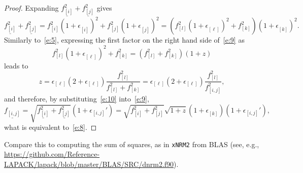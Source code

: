 \documentclass[a4paper,12pt,twoside]{article}
\begin{document}
\begin{proof}
  Expanding $\underline{f_{[i]}^2}+\underline{f_{[j]}^2}$ gives
  \begin{equation}
    \underline{f_{[i]}^2}+\underline{f_{[j]}^2}=f_{[i]}^2(1+\epsilon_{[i]}^{})^2+f_{[j]}^2(1+\epsilon_{[j]}^{})^2=(f_{[l]}^2(1+\epsilon_{[\ell]}^{})^2+f_{[k]}^2)(1+\epsilon_{[k]}^{})^2.
    \label{e:9}
  \end{equation}
  Similarly to~\eqref{e:5}, expressing the first factor on the right hand
  side of~\eqref{e:9} as
  \begin{equation}
    f_{[l]}^2(1+\epsilon_{[\ell]}^{})^2+f_{[k]}^2=(f_{[l]}^2+f_{[k]}^2)(1+z)
    \label{e:10}
  \end{equation}
  leads to
  \begin{displaymath}
    z=\epsilon_{[\ell]}(2+\epsilon_{[\ell]})\frac{f_{[l]}^2}{f_{[l]}^2+f_{[k]}^2}=\epsilon_{[\ell]}(2+\epsilon_{[\ell]})\frac{f_{[l]}^2}{f_{[i,j]}^2},
  \end{displaymath}
  and therefore, by substituting~\eqref{e:10} into~\eqref{e:9},
  \begin{displaymath}
    \underline{f_{[i,j]}^{}}=\sqrt{\underline{f_{[i]}^2}+\underline{f_{[j]}^2}}(1+\epsilon_{[i,j]}')=\sqrt{f_{[i]}^2+f_{[j]}^2}\sqrt{1+z}(1+\epsilon_{[k]}^{})(1+\epsilon_{[i,j]}'),
  \end{displaymath}
  what is equivalent to~\eqref{e:8}.
\end{proof}

Compare this to computing the sum of squares, as in \texttt{xNRM2}
from BLAS (see, e.g.,
\url{https://github.com/Reference-LAPACK/lapack/blob/master/BLAS/SRC/dnrm2.f90}).
\end{document}
